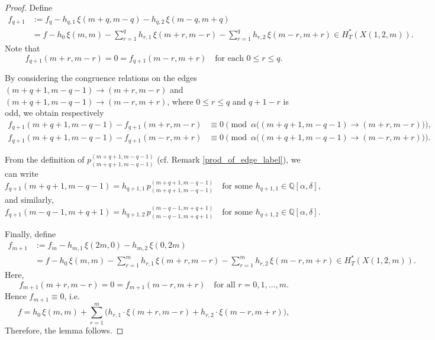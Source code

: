 \documentclass[10pt, a4paper, reqno]{amsart}
\begin{document}
\begin{proof}
		Define 
		\[
		\begin{split}
			f_{q+1} 
			&:= f_q - h_{q,1} \, \xi(m+q,m-q) - h_{q,2} \, \xi(m-q,m+q) \\
			&= f - h_0 \, \xi(m,m) 
			- \sum_{r=1}^{q} h_{r,1} \, \xi(m+r,m-r)
			- \sum_{r=1}^{q} h_{r,2} \, \xi(m-r,m+r)
			\in H_T^*(X(1,2,m)).
		\end{split}
		\]
		Note that 
		\[
		f_{q+1}(m+r,m-r) = 0 = f_{q+1}(m-r,m+r)
		\quad \text{for each } 0 \leq r \leq q.
		\]
		
		By considering the congruence relations on the edges 
		\((m+q+1,m-q-1) \to (m+r,m-r)\) and 
		\((m+q+1,m-q-1) \to (m-r,m+r)\),
		where \(0 \leq r \leq q\) and \(q+1-r\) is odd, 
		we obtain respectively  
		\begin{align*}
			f_{q+1}(m+q+1,m-q-1) - f_{q+1}(m+r,m-r)
			&\equiv 0 \pmod{\alpha\big((m+q+1,m-q-1)\to (m+r,m-r)\big)}, \\
			f_{q+1}(m+q+1,m-q-1) - f_{q+1}(m-r,m+r)
			&\equiv 0 \pmod{\alpha\big((m+q+1,m-q-1)\to (m-r,m+r)\big)}.
		\end{align*}
		
		From the definition of \( p^{(m+q+1,m-q-1)}_{(m+q+1,m-q-1)} \) (cf. Remark \ref{prod_of_edge_label}),
		we can write  
		\[
		f_{q+1}(m+q+1,m-q-1) 
		= h_{q+1,1} \, p^{(m+q+1,m-q-1)}_{(m+q+1,m-q-1)} 
		\quad \text{for some } h_{q+1,1} \in \mathbb{Q}[\alpha,\delta],
		\]
		and similarly,  
		\[
		f_{q+1}(m-q-1,m+q+1) 
		= h_{q+1,2} \, p^{(m-q-1,m+q+1)}_{(m-q-1,m+q+1)} 
		\quad \text{for some } h_{q+1,2} \in \mathbb{Q}[\alpha,\delta].
		\]
		
		Finally, define 
		\[
		\begin{split}
			f_{m+1}
			&:= f_m - h_{m,1} \, \xi(2m,0) - h_{m,2} \, \xi(0,2m) \\
			&= f - h_0 \, \xi(m,m)
			- \sum_{r=1}^{m} h_{r,1} \, \xi(m+r,m-r)
			- \sum_{r=1}^{m} h_{r,2} \, \xi(m-r,m+r)
			\in H_T^*(X(1,2,m)).
		\end{split}
		\]
		Here,
		\[
		f_{m+1}(m+r,m-r) = 0 = f_{m+1}(m-r,m+r)
		\quad \text{for all } r = 0,1,\ldots,m.
		\]
		Hence $f_{m+1} \equiv 0$, i.e. 
		\begin{equation}
			f = h_0 \, \xi(m,m) + \sum_{r=1}^{m} \big( h_{r,1} \cdot \xi(m+r,m-r) + h_{r,2} \cdot \xi(m-r,m+r) \big),
		\end{equation}
		Therefore, the lemma follows.
	\end{proof}
\end{document}

